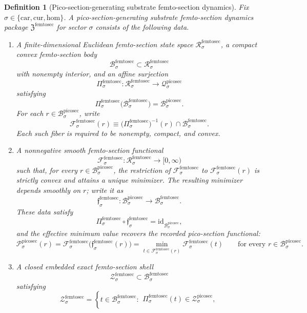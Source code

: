 \documentclass[11pt]{article}
\newcommand{\Car}{\mathrm{car}}
\newcommand{\Cur}{\mathrm{cur}}
\newcommand{\Hom}{\mathrm{hom}}
\newcommand{\PicoSectionSpace}[1]{\mathcal Q_{#1}^{\mathrm{picosec}}}
\newcommand{\PicoSectionBody}[1]{\mathcal B_{#1}^{\mathrm{picosec}}}
\newcommand{\PicoSectionFunctional}[1]{\mathscr P_{#1}^{\mathrm{picosec}}}
\newcommand{\PicoSectionShell}[1]{\mathcal Z_{#1}^{\mathrm{picosec}}}
\newcommand{\FemtoSectionPackage}{\mathfrak Z^{\mathrm{femtosec}}}
\newcommand{\FemtoSectionSpace}[1]{\mathcal R_{#1}^{\mathrm{femtosec}}}
\newcommand{\FemtoSectionBody}[1]{\mathcal B_{#1}^{\mathrm{femtosec}}}
\newcommand{\FemtoSectionProj}[1]{\Pi_{#1}^{\mathrm{femtosec}}}
\newcommand{\FemtoSectionFiber}[2]{\mathcal F_{#1}^{\mathrm{femtosec}}(#2)}
\newcommand{\FemtoSectionPicoMin}[1]{\mathfrak f_{#1}^{\mathrm{femtosec}}}
\newcommand{\FemtoSectionFunctional}[1]{\mathscr F_{#1}^{\mathrm{femtosec}}}
\newcommand{\FemtoSectionShell}[1]{\mathcal Z_{#1}^{\mathrm{femtosec}}}
\newtheorem{definition}{Definition}
\begin{document}
\begin{definition}[Pico-section-generating substrate femto-section dynamics]
\label{def:femtosec}
Fix \(\sigma\in\{\Car,\Cur,\Hom\}\). A \emph{pico-section-generating substrate femto-section dynamics package} \(\FemtoSectionPackage\) for sector \(\sigma\) consists of the following data.
\begin{enumerate}
    \item A finite-dimensional Euclidean femto-section state space \(\FemtoSectionSpace{\sigma}\), a compact convex femto-section body
    \[
    \FemtoSectionBody{\sigma}\subset\FemtoSectionSpace{\sigma}
    \]
    with nonempty interior, and an affine surjection
    \[
    \FemtoSectionProj{\sigma}:\FemtoSectionSpace{\sigma}\to\PicoSectionSpace{\sigma}
    \]
    satisfying
    \[
    \FemtoSectionProj{\sigma}\bigl(\FemtoSectionBody{\sigma}\bigr)=\PicoSectionBody{\sigma}.
    \]
    For each \(r\in\PicoSectionBody{\sigma}\), write
    \[
    \FemtoSectionFiber{\sigma}{r}
    \equiv
    \bigl(\FemtoSectionProj{\sigma}\bigr)^{-1}(r)\cap\FemtoSectionBody{\sigma}.
    \]
    Each such fiber is required to be nonempty, compact, and convex.
    \item A nonnegative smooth femto-section functional
    \[
    \FemtoSectionFunctional{\sigma}:\FemtoSectionSpace{\sigma}\to[0,\infty)
    \]
    such that, for every \(r\in\PicoSectionBody{\sigma}\), the restriction of \(\FemtoSectionFunctional{\sigma}\) to \(\FemtoSectionFiber{\sigma}{r}\) is strictly convex and attains a unique minimizer. The resulting minimizer depends smoothly on \(r\); write it as
    \[
    \FemtoSectionPicoMin{\sigma}:\PicoSectionBody{\sigma}\to\FemtoSectionBody{\sigma}.
    \]
    These data satisfy
    \[
    \FemtoSectionProj{\sigma}\circ\FemtoSectionPicoMin{\sigma}
    =
    \mathrm{id}_{\PicoSectionBody{\sigma}},
    \]
    and the effective minimum value recovers the recorded pico-section functional:
    \[
    \PicoSectionFunctional{\sigma}(r)
    =
    \FemtoSectionFunctional{\sigma}\bigl(\FemtoSectionPicoMin{\sigma}(r)\bigr)
    =
    \min_{t\in\FemtoSectionFiber{\sigma}{r}}
    \FemtoSectionFunctional{\sigma}(t)
    \qquad
    \text{for every }
    r\in\PicoSectionBody{\sigma}.
    \]
    \item A closed embedded exact femto-section shell
    \[
    \FemtoSectionShell{\sigma}\subset\FemtoSectionBody{\sigma}
    \]
    satisfying
    \[
    \FemtoSectionShell{\sigma}
    =
    \left\{
    t\in\FemtoSectionBody{\sigma}:
    \begin{array}{l}
    \FemtoSectionProj{\sigma}(t)\in\PicoSectionShell{\sigma},\\[0.2em]

\end{array}\]
\end{enumerate}
\end{definition}
\end{document}
